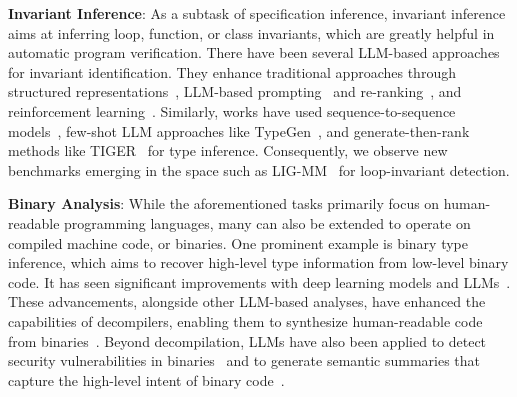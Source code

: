 \textbf{Invariant Inference}:
As a subtask of specification inference, invariant inference aims at inferring loop, function, or class invariants, which are greatly helpful in automatic program verification.
There have been several LLM-based approaches for invariant identification. 
They enhance traditional approaches through structured representations~\citep{si2018learning}, LLM-based prompting~\citep{kamath2023finding, pei2023can} and re-ranking~\citep{chakraborty2023ranking}, and reinforcement learning~\citep{yu2023loop}. 
Similarly, works have used sequence-to-sequence models~\citep{wei2023typet5}, few-shot LLM approaches like TypeGen~\citep{peng2023generative}, and generate-then-rank methods like TIGER~\citep{wang2024tiger} for type inference. 
Consequently, we observe new benchmarks emerging in the space such as LIG-MM~\citep{liu2024towards} for loop-invariant detection. 

\textbf{Binary Analysis}:
While the aforementioned tasks primarily focus on human-readable programming languages, many can also be extended to operate on compiled machine code, or binaries. 
One prominent example is binary type inference, which aims to recover high-level type information from low-level binary code.
It has seen significant improvements with deep learning models and LLMs~\citep{pei2021stateformer, zhu2024tygr}. 
These advancements, alongside other LLM-based analyses, have enhanced the capabilities of decompilers, enabling them to synthesize human-readable code from binaries~\citep{liu2025controlflowaugmenteddecompilerbased}. 
Beyond decompilation, LLMs have also been applied to detect security vulnerabilities in binaries~\citep{liu2023harnessing} and to generate semantic summaries that capture the high-level intent of binary code~\citep{jin2023binarycodesummarizationbenchmarking}.


